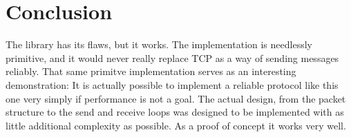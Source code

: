 \documentclass[11pt]{article}
\begin{document}
\section{Conclusion}
The library has its flaws, but it works.  The implementation is needlessly primitive, and it would never really replace TCP as a way of sending messages reliably.  That same primitve implementation serves as an interesting demonstration:  It is actually possible to implement a reliable protocol like this one very simply if performance is not a goal.  The actual design, from the packet structure to the send and receive loops was designed to be implemented with as little additional complexity as possible.  As a proof of concept it works very well.
\end{document}

